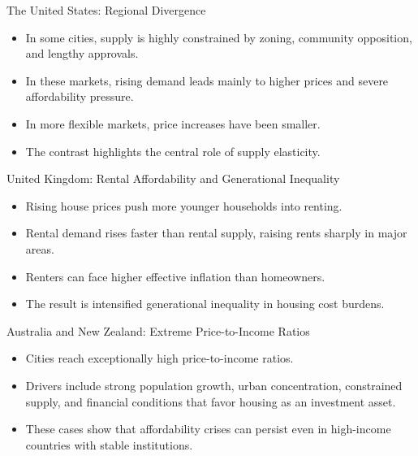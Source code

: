 \documentclass[aspectratio=169]{beamer}
\begin{document}
\begin{frame}{The United States: Regional Divergence}
\transfade
\begin{itemize}
  \item In some cities, supply is highly constrained by zoning, community opposition, and lengthy approvals.
  \item In these markets, rising demand leads mainly to higher prices and severe affordability pressure.
  \item In more flexible markets, price increases have been smaller.
  \item The contrast highlights the central role of supply elasticity.
\end{itemize}
\end{frame}

\begin{frame}{United Kingdom: Rental Affordability and Generational Inequality}
\transfade
\begin{itemize}
  \item Rising house prices push more younger households into renting.
  \item Rental demand rises faster than rental supply, raising rents sharply in major areas.
  \item Renters can face higher effective inflation than homeowners.
  \item The result is intensified generational inequality in housing cost burdens.
\end{itemize}
\end{frame}

\begin{frame}{Australia and New Zealand: Extreme Price-to-Income Ratios}
\transfade
\begin{itemize}
  \item Cities reach exceptionally high price-to-income ratios.
  \item Drivers include strong population growth, urban concentration, constrained supply, and financial conditions that favor housing as an investment asset.
  \item These cases show that affordability crises can persist even in high-income countries with stable institutions.
\end{itemize}
\end{frame}
\end{document}
